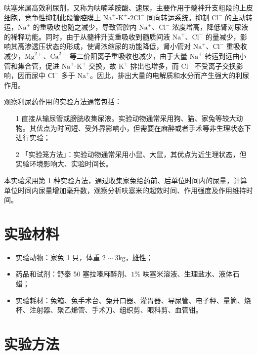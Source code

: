 \documentclass[UTF8]{ctexart}
\begin{document}
呋塞米属高效利尿剂，又称为呋喃苯胺酸、速尿，主要作用于髓袢升支粗段的上皮细胞，竞争性抑制此段管腔膜上 $\text{Na}^+$-$\text{K}^+$-$2\text{Cl}^-$ 同向转运系统。抑制 $\text{Cl}^-$ 的主动转运，$\text{Na}^+$ 的重吸收也随之减少，导致管腔内 $\text{Na}^+$、$\text{Cl}^-$ 浓度增高，降低肾对尿液的稀释功能。同时，由于从髓袢升支重吸收到髓质间液 $\text{Na}^+$、$\text{Cl}^-$ 的量减少，影响其高渗透压状态的形成，使肾浓缩尿的功能降低，肾小管对 $\text{Na}^+$、$\text{Cl}^-$ 重吸收减少，$\text{Mg}^{2+}$、$\text{Ca}^{2+}$ 等二价阳离子重吸收也减少，由于大量 $\text{Na}^+$ 转运到远曲小管和集合管，促进 $\text{Na}^+$-$\text{K}^+$ 交换，故 $\text{K}^+$ 排出也增多，而 $\text{Cl}^-$ 不受离子交换影响，因而尿中 $\text{Cl}^-$ 多于 $\text{Na}^+$。因此，排出大量的电解质和水分而产生强大的利尿作用。

观察利尿药作用的实验方法通常包括：

\begin{itemize}
    \item [1] 直接从输尿管或膀胱收集尿液。实验动物通常采用狗、猫、家兔等较大动物。其优点为时间短、受外界影响小，但需要在麻醉或者手术等非生理状态下进行实验；
    \item [2] 「实验笼方法」：实验动物通常采用小鼠、大鼠，其优点为近生理状态，但实验环境影响大、实验时间长。
\end{itemize}

本实验采用第 1 种实验方法，通过收集家兔给药前、后单位时间内的尿量，计算单位时间内尿量增加毫升数，观察分析呋塞米的起效时间、作用强度及作用维持时间。

\section{实验材料}

\begin{itemize}
    \item 实验动物：家兔 1 只，体重 $2\sim 3\text{kg}$，雄性；
    \item 药品和试剂：舒泰 50 塞拉嗪麻醉剂、$1\%$ 呋塞米溶液、生理盐水、液体石蜡；
    \item 实验耗材：兔箱、兔手术台、兔开口器、灌胃器、导尿管、电子秤、量筒、烧杯、注射器、聚乙烯管、手术刀、组织剪、眼科剪、血管钳。
\end{itemize}

\section{实验方法}
\end{document}
